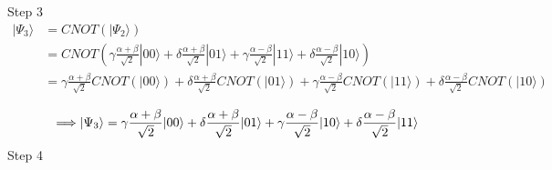 \documentclass{article}
\begin{document}
Step 3
\begin{equation}
\begin{split}
    |\Psi_3\rangle & = CNOT(|\Psi_2\rangle) \\
    & = CNOT(\gamma\frac{\alpha + \beta}{\sqrt{2}}|00\rangle
        + \delta\frac{\alpha + \beta}{\sqrt{2}}|01\rangle
        + \gamma\frac{\alpha - \beta}{\sqrt{2}}|11\rangle
        + \delta\frac{\alpha - \beta}{\sqrt{2}}|10\rangle) \\
    & = \gamma\frac{\alpha + \beta}{\sqrt{2}}CNOT(|00\rangle)
        + \delta\frac{\alpha + \beta}{\sqrt{2}}CNOT(|01\rangle)
        + \gamma\frac{\alpha - \beta}{\sqrt{2}}CNOT(|11\rangle)
        + \delta\frac{\alpha - \beta}{\sqrt{2}}CNOT(|10\rangle) \\
\end{split}
\end{equation}
\begin{equation}
    \Longrightarrow |\Psi_3\rangle = \gamma\frac{\alpha + \beta}{\sqrt{2}}|00\rangle
        + \delta\frac{\alpha + \beta}{\sqrt{2}}|01\rangle
        + \gamma\frac{\alpha - \beta}{\sqrt{2}}|10\rangle
        + \delta\frac{\alpha - \beta}{\sqrt{2}}|11\rangle \\
\end{equation}
Step 4
\end{document}
